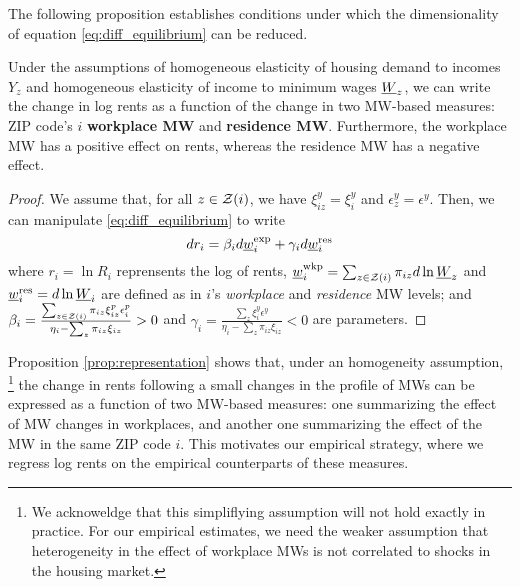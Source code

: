The following proposition establishes conditions under which the dimensionality
of equation \ref{eq:diff_equilibrium} can be reduced.

\begin{prop}[Representation]\label{prop:representation}
    Under the assumptions of 
    homogeneous elasticity of housing demand to incomes $Y_z$ and
    homogeneous elasticity of income to minimum wages $\underline{W}_z$,
    we can write the change in log rents as a function of the change in two 
    MW-based measures: ZIP code's $i$ \textbf{workplace MW} and 
    \textbf{residence MW}.
    Furthermore, the workplace MW has a positive effect on rents, whereas the
    residence MW has a negative effect.
\end{prop}
\begin{proof}
    We assume that, for all $z\in\mathcal{Z}(i)$, we have 
    $\xi^y_{iz}=\xi^y_{i}$ and 
    $\epsilon_z^y=\epsilon^y$.
    Then, we can manipulate \eqref{eq:diff_equilibrium} to write
    \begin{equation} \label{eq:theory_represenation}
        d r_i = \beta_i  d \underline{w}^{\text{exp}}_i
              + \gamma_i d \underline{w}^{\text{res}}_i
    \end{equation}
    where
    $r_i=\ln R_i$ reprensents the log of rents,
    $\underline{w}^{\text{wkp}}_i = \sum_{z\in\mathcal{Z}(i)} \pi_{iz} d \ln \underline{W}_z$ and
    $\underline{w}^{\text{res}}_i = d \ln \underline{W}_i$ are defined as in $i$'s 
    \textit{workplace} and \textit{residence} MW levels; and
    $\beta_i = \frac{\sum_{z\in\mathcal{Z}(i)}\pi_{iz}\xi_{iz}^{p}\epsilon_{i}^{p}}
                    {\eta_{i} - \sum_z \pi_{iz} \xi_{iz}} 
             >0$ and
    $\gamma_i = \frac{\sum_z \xi_{i}^{y}\epsilon^{y}}
                     {\eta_{i} - \sum_z \pi_{iz} \xi_{iz}} 
              < 0$
    are parameters.
\end{proof}

Proposition \ref{prop:representation} shows that, under an homogeneity assumption,%
\footnote{We acknoweldge that this simpliflying assumption will not hold exactly
in practice.
For our empirical estimates, we need the weaker assumption that heterogeneity in 
the effect of workplace MWs is not correlated to shocks in the housing market.}
the change in rents following a small changes in the profile of MWs can be expressed 
as a function of two MW-based measures: 
one summarizing the effect of MW changes in workplaces,
and another one summarizing the effect of the MW in the same ZIP code $i$.
This motivates our empirical strategy, where we regress log rents on the empirical
counterparts of these measures.

